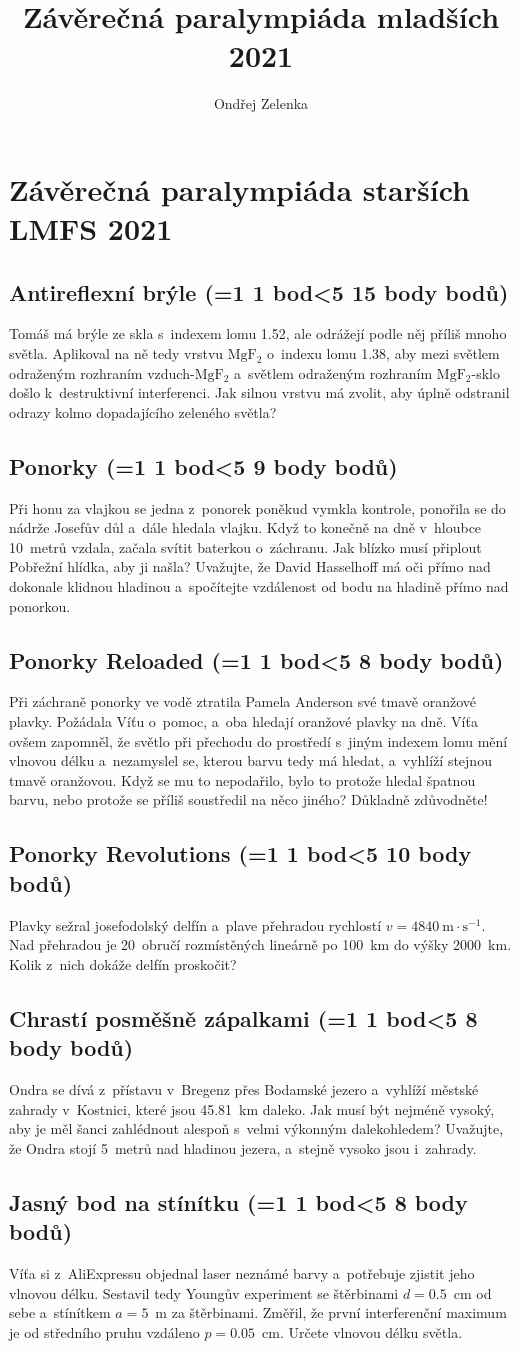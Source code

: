 \documentclass[10pt,a4paper,landscape,twocolumn]{article}
\author{Ondřej Zelenka}
\title{Závěrečná paralympiáda mladších 2021}
\newcounter{bodycounter}
\newcommand{\bodystring}[1]{\ifnum #1=1 1 bod\else\ifnum #1<5 #1 body\else #1 bodů\fi\fi}
\newcommand{\uloha}[3]{
\subsection{#1 (\bodystring{#2})}
#3\addtocounter{bodycounter}{#2}}
\begin{document}
\section*{Závěrečná paralympiáda starších LMFS 2021}

\uloha{Antireflexní brýle}{15}{
Tomáš má brýle ze skla s~indexem lomu 1.52, ale odrážejí podle něj příliš mnoho světla. Aplikoval na ně tedy vrstvu $\mathrm{MgF_2}$ o~indexu lomu 1.38, aby mezi světlem odraženým rozhraním vzduch-$\mathrm{MgF_2}$ a~světlem odraženým rozhraním $\mathrm{MgF_2}$-sklo došlo k~destruktivní interferenci. Jak silnou vrstvu má zvolit, aby úplně odstranil odrazy kolmo dopadajícího zeleného světla?
}

\uloha{Ponorky}{9}{
Při honu za vlajkou se jedna z~ponorek poněkud vymkla kontrole, ponořila se do nádrže Josefův důl a~dále hledala vlajku. Když to konečně na dně v~hloubce 10~metrů vzdala, začala svítit baterkou o~záchranu. Jak blízko musí připlout Pobřežní hlídka, aby ji našla? Uvažujte, že David Hasselhoff má oči přímo nad dokonale klidnou hladinou a~spočítejte vzdálenost od bodu na hladině přímo nad ponorkou.
}

\uloha{Ponorky Reloaded}{8}{
Při záchraně ponorky ve vodě ztratila Pamela Anderson své tmavě oranžové plavky. Požádala Víťu o~pomoc, a~oba hledají oranžové plavky na dně. Víťa ovšem zapomněl, že světlo při přechodu do prostředí s~jiným indexem lomu mění vlnovou délku a~nezamyslel se, kterou barvu tedy má hledat, a~vyhlíží stejnou tmavě oranžovou. Když se mu to nepodařilo, bylo to protože hledal špatnou barvu, nebo protože se příliš soustředil na něco jiného? Důkladně zdůvodněte!
}

\uloha{Ponorky Revolutions}{10}{
Plavky sežral josefodolský delfín a~plave přehradou rychlostí $v = 4840~\mathrm{m\cdot s^{-1}}$. Nad přehradou je 20~obručí rozmístěných lineárně po 100~km do výšky 2000~km. Kolik z~nich dokáže delfín proskočit?
}

\uloha{Chrastí posměšně zápalkami}{8}{
Ondra se dívá z~přístavu v~Bregenz přes Bodamské jezero a~vyhlíží městské zahrady v~Kostnici, které jsou 45.81~km daleko. Jak musí být nejméně vysoký, aby je měl šanci zahlédnout alespoň s~velmi výkonným dalekohledem? Uvažujte, že Ondra stojí 5~metrů nad hladinou jezera, a~stejně vysoko jsou i~zahrady.
}

\uloha{Jasný bod na stínítku}{8}{
Víťa si z~AliExpressu objednal laser neznámé barvy a~potřebuje zjistit jeho vlnovou délku. Sestavil tedy Youngův experiment se štěrbinami $d = 0.5$~cm od sebe a~stínítkem $a = 5$~m za štěrbinami. Změřil, že první interferenční maximum je od středního pruhu vzdáleno $p = 0.05$~cm. Určete vlnovou délku světla.
}
\end{document}

